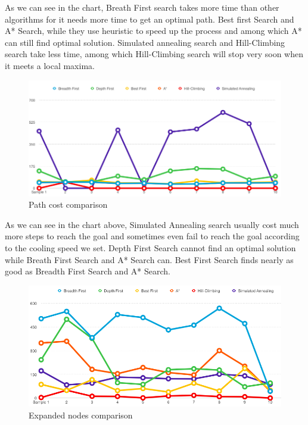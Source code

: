 \documentclass[a4paper]{article}
\begin{document}
As we can see in the chart, Breath First search takes more time than other algorithms for it needs more time to get an optimal path. Best first Search and A* Search, while they use heuristic to speed up the process and among which A* can still find optimal solution. Simulated annealing search and Hill-Climbing search take less time, among which Hill-Climbing search will stop very soon when it meets a local maxima. \\

\begin{figure}[h!]
  \centering
    \includegraphics[scale=.4]{images/path_cost.png}
  \caption{Path cost comparison}
\end{figure}

As we can see in the chart above, Simulated Annealing search usually cost much more steps to reach the goal and sometimes even fail to reach the goal according to the cooling speed we set. Depth First Search cannot find an optimal solution while Breath First Search and A* Search can. Best First Search finds nearly as good as Breadth First Search and A* Search. \\

\begin{figure}[h!]
  \centering
    \includegraphics[scale=.4]{images/expanded_node.png}
  \caption{Expanded nodes comparison}
\end{figure}
\end{document}
